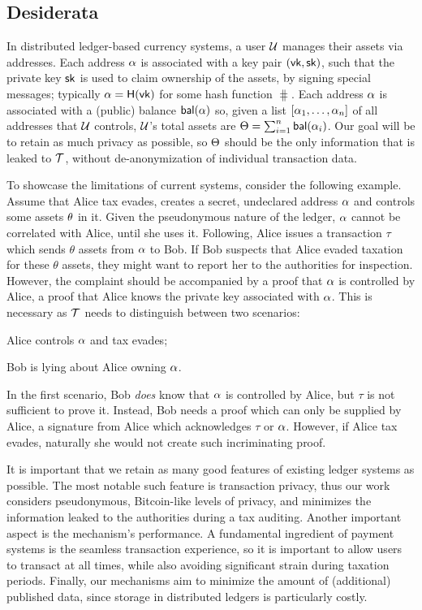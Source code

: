 \subsection{Desiderata}\label{sec:taxation-desiderata}

In distributed ledger-based currency systems, a user $\mathcal{U}$ manages their
assets via addresses. Each address $\alpha$ is associated with a key pair
$(\mathsf{vk}, \mathsf{sk})$, such that the private key $\mathsf{sk}$ is used to claim ownership of
the assets, \eg by signing special messages; typically $\alpha =
\mathsf{H}(\mathsf{vk})$ for some hash function $\hash$. Each address $\alpha$ is
associated with a (public) balance $\mathsf{bal}(\alpha)$ so, given a list
$[\alpha_1, \dots, \alpha_n]$ of all addresses that $\mathcal{U}$ controls,
$\mathcal{U}$'s total assets are $\Theta = \sum_{i=1}^n \mathsf{bal}(\alpha_i)$. Our
goal will be to retain as much privacy as possible, so $\Theta$ should be the
only information that is leaked to $\mathcal{T}$, without
de-anonymization of individual transaction data.

To showcase the limitations of current systems, consider the following example.
Assume that Alice tax evades, \ie creates a secret, undeclared address
$\alpha$ and controls some assets $\theta$ in it. Given the pseudonymous
nature of the ledger, $\alpha$ cannot be correlated with Alice, until she
uses it. Following, Alice issues a transaction $\tau$ which sends $\theta$
assets from $\alpha$ to Bob. If Bob suspects that Alice evaded taxation for
these $\theta$ assets, they might want to report her to the authorities for
inspection. However, the complaint should be accompanied by a proof that
$\alpha$ is controlled by Alice, \ie a proof that Alice knows the private key
associated with $\alpha$. This is necessary as $\mathcal{T}$ needs to
distinguish between two scenarios:
\begin{inparaenum}[i)]
    \item Alice controls $\alpha$ and tax evades;
    \item Bob is lying about Alice owning $\alpha$.
\end{inparaenum}
In the first scenario, Bob \emph{does} know that $\alpha$ is controlled by
Alice, but $\tau$ is not sufficient to prove it.
Instead, Bob needs a proof which can only be supplied by Alice, \eg a signature
from Alice which acknowledges $\tau$ or $\alpha$. However, if Alice tax
evades, naturally she would not create such incriminating proof.

It is important that we retain as many good features of existing ledger systems
as possible. The most notable such feature is transaction privacy, thus our
work considers pseudonymous, Bitcoin-like levels of privacy, and minimizes the
information leaked to the authorities during a tax auditing. Another important
aspect is the mechanism's performance. A fundamental ingredient of payment
systems is the seamless transaction experience, so it is important to allow
users to transact at all times, while also avoiding significant strain during
taxation periods. Finally, our mechanisms aim to minimize the amount of
(additional) published data, since storage in
distributed ledgers is particularly costly.

